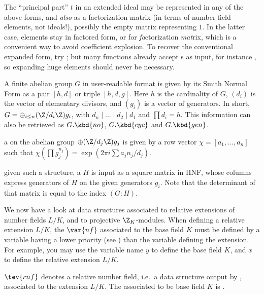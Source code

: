 The ``principal part'' $t$ in an extended ideal may be
represented in any of the above forms, and \emph{also} as a factorization
matrix (in terms of number field elements, not ideals!), possibly the empty
matrix \kbd{[;]} representing $1$. In the latter case, elements stay in
factored form, or  for \emph{fa}ctorization \emph{mat}rix, which
is a convenient way to avoid coefficient explosion. To recover the
conventional expanded form, try ; but many functions
already accept s as input, for instance , so
expanding huge elements should never be necessary.


A finite abelian group $G$ in user-readable format is given by its Smith
Normal Form as a pair $[h,d]$ or triple $[h,d,g]$.
Here $h$ is the cardinality of $G$, $(d_i)$ is the vector of elementary
divisors, and $(g_i)$ is a vector of generators. In short,
$G = \oplus_{i\leq n} (\Z/d_i\Z) g_i$, with $d_n \mid \dots \mid d_2 \mid d_1$
and $\prod d_i = h$. This information can also be retrieved as
$G.\kbd{no}$, $G.\kbd{cyc}$ and $G.\kbd{gen}$.

\item a  on the abelian group
$\oplus (\Z/d_j\Z) g_j$
is given by a row vector $\chi = [a_1,\ldots,a_n]$ such that
$\chi(\prod g_j^{n_j}) = \exp(2\pi i\sum a_j n_j / d_j)$.

\item given such a structure, a  $H$ is input as a square
matrix in HNF, whose columns express generators of $H$ on the given generators
$g_i$. Note that the determinant of that matrix is equal to the index $(G:H)$.


We now have a look at data structures associated to relative extensions
of number fields $L/K$, and to projective $\Z_K$-modules. When defining a
relative extension $L/K$, the $\var{nf}$ associated to the base field $K$
must be defined by a variable having a lower priority (see
) than the variable defining the extension. For example,
you may use the variable name $y$ to define the base field $K$, and $x$ to
define the relative extension $L/K$.

\label{se:ZKmodules}

\item $\tev{rnf}$ denotes a relative number field, i.e.~a data structure
output by , associated to the extension $L/K$. The 
associated to be base field $K$ is .

